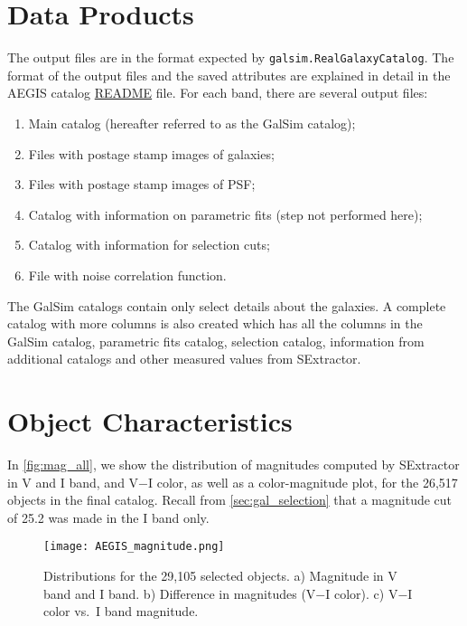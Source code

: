 \documentclass[a4paper,11pt]{article}
\begin{document}
\section{Data Products}
\label{sec:data}
The output files are in the format expected by {\tt galsim.RealGalaxyCatalog}. The format of the output files and the saved attributes are explained in detail in the AEGIS catalog  \href{https://github.com/sowmyakth/true_gal_colors/blob/master/AEGIS_25.2_training_sample_readme.txt}{README} file. 
For each band, there are several output files:
\begin{enumerate}
\item Main catalog (hereafter referred to as the GalSim catalog);
\item Files with postage stamp images of galaxies;
\item Files with postage stamp images of PSF;
\item Catalog with information on parametric fits (step not performed here);
\item Catalog with information for selection cuts;
\item File with noise correlation function.
\end{enumerate}

The GalSim catalogs contain only select details about the galaxies. A complete catalog with more columns is also created which has all the columns in the GalSim catalog, parametric fits catalog, selection catalog, information from additional catalogs and other measured values from SExtractor. 

\section{Object Characteristics}
\label{sec:analysis} 
In \autoref{fig:mag_all}, we show the distribution of magnitudes computed by SExtractor in V and I band, and V$-$I color, as well as a color-magnitude plot, for the 26,517 objects in the final catalog. 
Recall from \autoref{sec:gal_selection} that a magnitude cut of 25.2 was made in the I band only.
\begin{figure}[h]
\centering\texttt{[image: AEGIS\_magnitude.png]}
\caption{Distributions for the 29,105 selected objects. a) Magnitude in V band and I band. b) Difference in magnitudes (V$-$I color).  c) V$-$I color vs.~I band magnitude.}
\label{fig:mag_all}
\end{figure}
\end{document}
